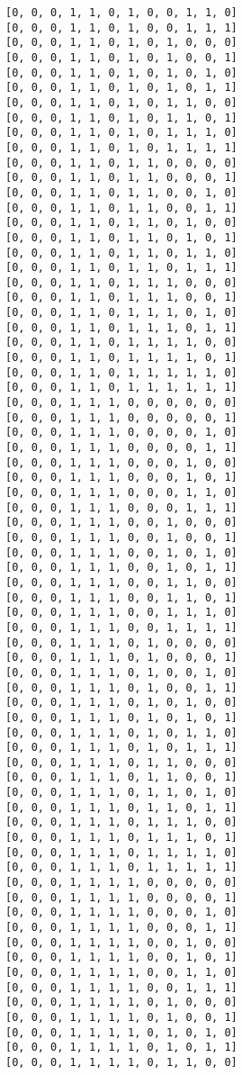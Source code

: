 \documentclass[11pt]{article}
\begin{document}
\begin{Verbatim}[commandchars=\\\{\}]
[0, 0, 0, 1, 1, 0, 1, 0, 0, 1, 1, 0]
[0, 0, 0, 1, 1, 0, 1, 0, 0, 1, 1, 1]
[0, 0, 0, 1, 1, 0, 1, 0, 1, 0, 0, 0]
[0, 0, 0, 1, 1, 0, 1, 0, 1, 0, 0, 1]
[0, 0, 0, 1, 1, 0, 1, 0, 1, 0, 1, 0]
[0, 0, 0, 1, 1, 0, 1, 0, 1, 0, 1, 1]
[0, 0, 0, 1, 1, 0, 1, 0, 1, 1, 0, 0]
[0, 0, 0, 1, 1, 0, 1, 0, 1, 1, 0, 1]
[0, 0, 0, 1, 1, 0, 1, 0, 1, 1, 1, 0]
[0, 0, 0, 1, 1, 0, 1, 0, 1, 1, 1, 1]
[0, 0, 0, 1, 1, 0, 1, 1, 0, 0, 0, 0]
[0, 0, 0, 1, 1, 0, 1, 1, 0, 0, 0, 1]
[0, 0, 0, 1, 1, 0, 1, 1, 0, 0, 1, 0]
[0, 0, 0, 1, 1, 0, 1, 1, 0, 0, 1, 1]
[0, 0, 0, 1, 1, 0, 1, 1, 0, 1, 0, 0]
[0, 0, 0, 1, 1, 0, 1, 1, 0, 1, 0, 1]
[0, 0, 0, 1, 1, 0, 1, 1, 0, 1, 1, 0]
[0, 0, 0, 1, 1, 0, 1, 1, 0, 1, 1, 1]
[0, 0, 0, 1, 1, 0, 1, 1, 1, 0, 0, 0]
[0, 0, 0, 1, 1, 0, 1, 1, 1, 0, 0, 1]
[0, 0, 0, 1, 1, 0, 1, 1, 1, 0, 1, 0]
[0, 0, 0, 1, 1, 0, 1, 1, 1, 0, 1, 1]
[0, 0, 0, 1, 1, 0, 1, 1, 1, 1, 0, 0]
[0, 0, 0, 1, 1, 0, 1, 1, 1, 1, 0, 1]
[0, 0, 0, 1, 1, 0, 1, 1, 1, 1, 1, 0]
[0, 0, 0, 1, 1, 0, 1, 1, 1, 1, 1, 1]
[0, 0, 0, 1, 1, 1, 0, 0, 0, 0, 0, 0]
[0, 0, 0, 1, 1, 1, 0, 0, 0, 0, 0, 1]
[0, 0, 0, 1, 1, 1, 0, 0, 0, 0, 1, 0]
[0, 0, 0, 1, 1, 1, 0, 0, 0, 0, 1, 1]
[0, 0, 0, 1, 1, 1, 0, 0, 0, 1, 0, 0]
[0, 0, 0, 1, 1, 1, 0, 0, 0, 1, 0, 1]
[0, 0, 0, 1, 1, 1, 0, 0, 0, 1, 1, 0]
[0, 0, 0, 1, 1, 1, 0, 0, 0, 1, 1, 1]
[0, 0, 0, 1, 1, 1, 0, 0, 1, 0, 0, 0]
[0, 0, 0, 1, 1, 1, 0, 0, 1, 0, 0, 1]
[0, 0, 0, 1, 1, 1, 0, 0, 1, 0, 1, 0]
[0, 0, 0, 1, 1, 1, 0, 0, 1, 0, 1, 1]
[0, 0, 0, 1, 1, 1, 0, 0, 1, 1, 0, 0]
[0, 0, 0, 1, 1, 1, 0, 0, 1, 1, 0, 1]
[0, 0, 0, 1, 1, 1, 0, 0, 1, 1, 1, 0]
[0, 0, 0, 1, 1, 1, 0, 0, 1, 1, 1, 1]
[0, 0, 0, 1, 1, 1, 0, 1, 0, 0, 0, 0]
[0, 0, 0, 1, 1, 1, 0, 1, 0, 0, 0, 1]
[0, 0, 0, 1, 1, 1, 0, 1, 0, 0, 1, 0]
[0, 0, 0, 1, 1, 1, 0, 1, 0, 0, 1, 1]
[0, 0, 0, 1, 1, 1, 0, 1, 0, 1, 0, 0]
[0, 0, 0, 1, 1, 1, 0, 1, 0, 1, 0, 1]
[0, 0, 0, 1, 1, 1, 0, 1, 0, 1, 1, 0]
[0, 0, 0, 1, 1, 1, 0, 1, 0, 1, 1, 1]
[0, 0, 0, 1, 1, 1, 0, 1, 1, 0, 0, 0]
[0, 0, 0, 1, 1, 1, 0, 1, 1, 0, 0, 1]
[0, 0, 0, 1, 1, 1, 0, 1, 1, 0, 1, 0]
[0, 0, 0, 1, 1, 1, 0, 1, 1, 0, 1, 1]
[0, 0, 0, 1, 1, 1, 0, 1, 1, 1, 0, 0]
[0, 0, 0, 1, 1, 1, 0, 1, 1, 1, 0, 1]
[0, 0, 0, 1, 1, 1, 0, 1, 1, 1, 1, 0]
[0, 0, 0, 1, 1, 1, 0, 1, 1, 1, 1, 1]
[0, 0, 0, 1, 1, 1, 1, 0, 0, 0, 0, 0]
[0, 0, 0, 1, 1, 1, 1, 0, 0, 0, 0, 1]
[0, 0, 0, 1, 1, 1, 1, 0, 0, 0, 1, 0]
[0, 0, 0, 1, 1, 1, 1, 0, 0, 0, 1, 1]
[0, 0, 0, 1, 1, 1, 1, 0, 0, 1, 0, 0]
[0, 0, 0, 1, 1, 1, 1, 0, 0, 1, 0, 1]
[0, 0, 0, 1, 1, 1, 1, 0, 0, 1, 1, 0]
[0, 0, 0, 1, 1, 1, 1, 0, 0, 1, 1, 1]
[0, 0, 0, 1, 1, 1, 1, 0, 1, 0, 0, 0]
[0, 0, 0, 1, 1, 1, 1, 0, 1, 0, 0, 1]
[0, 0, 0, 1, 1, 1, 1, 0, 1, 0, 1, 0]
[0, 0, 0, 1, 1, 1, 1, 0, 1, 0, 1, 1]
[0, 0, 0, 1, 1, 1, 1, 0, 1, 1, 0, 0]

\end{Verbatim}
\end{document}
